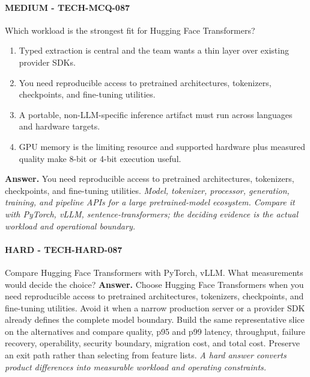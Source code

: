 \paragraph{MEDIUM - TECH-MCQ-087} Which workload is the strongest fit for Hugging Face Transformers?
\begin{enumerate}[label=\Alph*.]
\item Typed extraction is central and the team wants a thin layer over existing provider SDKs.
\item You need reproducible access to pretrained architectures, tokenizers, checkpoints, and fine-tuning utilities.
\item A portable, non-LLM-specific inference artifact must run across languages and hardware targets.
\item GPU memory is the limiting resource and supported hardware plus measured quality make 8-bit or 4-bit execution useful.
\end{enumerate}
\textbf{Answer.} You need reproducible access to pretrained architectures, tokenizers, checkpoints, and fine-tuning utilities.
\textit{Model, tokenizer, processor, generation, training, and pipeline APIs for a large pretrained-model ecosystem. Compare it with PyTorch, vLLM, sentence-transformers; the deciding evidence is the actual workload and operational boundary.}
\paragraph{HARD - TECH-HARD-087} Compare Hugging Face Transformers with PyTorch, vLLM. What measurements would decide the choice?
\textbf{Answer.} Choose Hugging Face Transformers when you need reproducible access to pretrained architectures, tokenizers, checkpoints, and fine-tuning utilities. Avoid it when a narrow production server or a provider SDK already defines the complete model boundary. Build the same representative slice on the alternatives and compare quality, p95 and p99 latency, throughput, failure recovery, operability, security boundary, migration cost, and total cost. Preserve an exit path rather than selecting from feature lists.
\textit{A hard answer converts product differences into measurable workload and operating constraints.}
